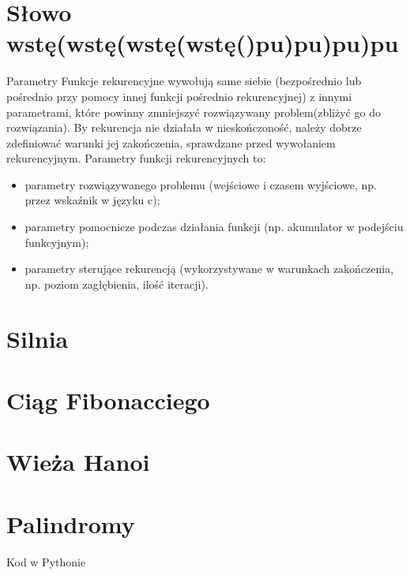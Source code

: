 
\section{Słowo wstę(wstę(wstę(wstę()pu)pu)pu)pu}\label{sec:introduction}
\begin{frame}{Parametry}
    Funkcje rekurencyjne wywołują same siebie (bezpośrednio lub pośrednio
    przy pomocy innej funkcji pośrednio rekurencyjnej) z innymi parametrami,
    które powinny zmniejszyć rozwiązywany problem(zbliżyć go do rozwiązania).
    By rekurencja nie działała w nieskończoność, należy dobrze zdefiniować
    warunki jej zakończenia, sprawdzane przed wywołaniem rekurencyjnym.
    Parametry funkcji rekurencyjnych to:
    \begin{itemize}
        \item parametry rozwiązywanego problemu
        (wejściowe i czasem wyjściowe, np. przez wskaźnik w języku c);
        \item parametry pomocnicze podczas działania funkcji
        (np. akumulator w podejściu funkcyjnym);
        \item parametry sterujące rekurencją
        (wykorzystywane w warunkach zakończenia, np. poziom zagłębienia, ilość iteracji).
    \end{itemize}
\end{frame}


\section{Silnia}\label{sec:factorial}



\section{Ciąg Fibonacciego}\label{sec:fibonacci}



\section{Wieża Hanoi}\label{sec:hanoi}



\section{Palindromy}\label{sec:palindrome}
\begin{frame}[fragile]{Kod w Pythonie}
    
\end{frame}


